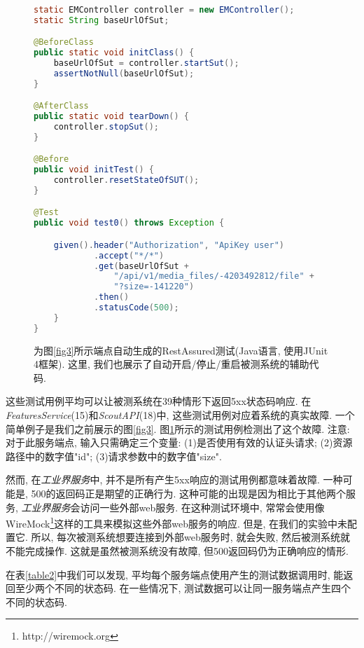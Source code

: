     \begin{figure}
        {
        \tt
        \tiny
      \begin{lstlisting}[language=java]
static EMController controller = new EMController();
static String baseUrlOfSut;

@BeforeClass
public static void initClass() {
    baseUrlOfSut = controller.startSut();
    assertNotNull(baseUrlOfSut);
}

@AfterClass
public static void tearDown() {
    controller.stopSut();
}

@Before
public void initTest() {
    controller.resetStateOfSUT();
}

@Test
public void test0() throws Exception {

    given().header("Authorization", "ApiKey user")
            .accept("*/*")
            .get(baseUrlOfSut + 
                "/api/v1/media_files/-4203492812/file" +
                "?size=-141220")
            .then()
            .statusCode(500);
    }
}
    \end{lstlisting}
        }
        \caption[]{为图\ref{fig3}所示端点自动生成的RestAssured测试(Java语言, 使用JUnit 4框架). 这里, 我们也展示了自动开启/停止/重启被测系统的辅助代码.}
        \label{fig5}
    \end{figure}
        
        这些测试用例平均可以让被测系统在39种情形下返回5xx状态码响应. 在\textit{FeaturesService}(15)和\textit{ScoutAPI}(18)中, 这些测试用例对应着系统的真实故障. 一个简单例子是我们之前展示的图\ref{fig3}. 图\ref{fig5}所示的测试用例检测出了这个故障. 注意: 对于此服务端点, 输入只需确定三个变量: (1)是否使用有效的认证头请求; (2)资源路径中的数字值"id"; (3)请求参数中的数字值"size". 
        
        然而, 在\textit{工业界服务}中, 并不是所有产生5xx响应的测试用例都意味着故障. 一种可能是, 500的返回码正是期望的正确行为. 这种可能的出现是因为相比于其他两个服务, \textit{工业界服务}会访问一些外部web服务. 在这种测试环境中, 常常会使用像WireMock\footnote{http://wiremock.org}这样的工具来模拟这些外部web服务的响应. 但是, 在我们的实验中未配置它. 所以, 每次被测系统想要连接到外部web服务时, 就会失败, 然后被测系统就不能完成操作. 这就是虽然被测系统没有故障, 但500返回码仍为正确响应的情形. 
        
        在表\ref{table2}中我们可以发现, 平均每个服务端点使用产生的测试数据调用时, 能返回至少两个不同的状态码. 在一些情况下, 测试数据可以让同一服务端点产生四个不同的状态码. 
        
    
